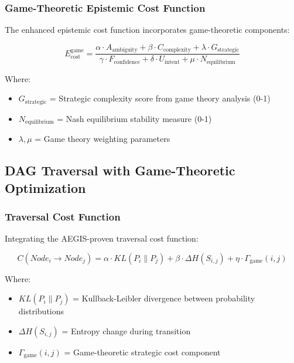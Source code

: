 \documentclass[12pt,a4paper]{article}
\begin{document}
\subsubsection{Game-Theoretic Epistemic Cost Function}

The enhanced epistemic cost function incorporates game-theoretic components:

\begin{equation}
E_{\text{cost}}^{\text{game}} = \frac{\alpha \cdot A_{\text{ambiguity}} + \beta \cdot C_{\text{complexity}} + \lambda \cdot G_{\text{strategic}}}{\gamma \cdot F_{\text{confidence}} + \delta \cdot U_{\text{intent}} + \mu \cdot N_{\text{equilibrium}}}
\end{equation}

Where:
\begin{itemize}
    \item $G_{\text{strategic}}$ = Strategic complexity score from game theory analysis (0-1)
    \item $N_{\text{equilibrium}}$ = Nash equilibrium stability measure (0-1)
    \item $\lambda, \mu$ = Game theory weighting parameters
\end{itemize}

\subsection{DAG Traversal with Game-Theoretic Optimization}

\subsubsection{Traversal Cost Function}

Integrating the AEGIS-proven traversal cost function:

\begin{equation}
C(Node_i \rightarrow Node_j) = \alpha \cdot KL(P_i \| P_j) + \beta \cdot \Delta H(S_{i,j}) + \eta \cdot \Gamma_{\text{game}}(i,j)
\end{equation}

Where:
\begin{itemize}
    \item $KL(P_i \| P_j)$ = Kullback-Leibler divergence between probability distributions
    \item $\Delta H(S_{i,j})$ = Entropy change during transition
    \item $\Gamma_{\text{game}}(i,j)$ = Game-theoretic strategic cost component
\end{itemize}
\end{document}
